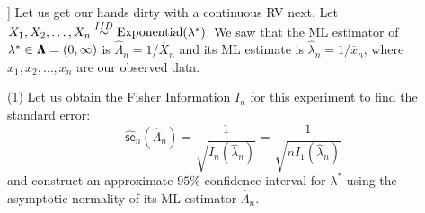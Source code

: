 {\begin{example}[[Fisher Information of the $\exponential$ Experiment]]\label{EX:ExponentialFisherInfo}
Let us get our hands dirty with a continuous RV next.  Let $X_1,X_2,\ldots,X_n \overset{IID}{\sim} \mbox{{\rm Exponential}}(\lambda^*)$.  We saw that the ML estimator of $\lambda^* \in {\Lambda}\mspace{-11 mu}{\Lambda}=(0,\infty)$ is $\widehat{\Lambda}_n = 1/\overline{X}_n$ and its ML estimate is $\widehat{\lambda}_n=1/\overline{x}_n$, where $x_1,x_2,\ldots,x_n$ are our observed data.

(1) Let us obtain the Fisher Information $I_n$ for this experiment to find the standard error:
\[
\widehat{\mathsf{se}}_n(\widehat{\Lambda}_n) = \frac{1}{\sqrt{I_n(\widehat{\lambda}_n)}}
= \frac{1}{\sqrt{n I_1(\widehat{\lambda}_n)}}
\]
and construct an approximate $95\%$ confidence interval for $\lambda^*$ using the asymptotic normality of its ML estimator $\widehat{\Lambda}_n$.  


\end{example}}
